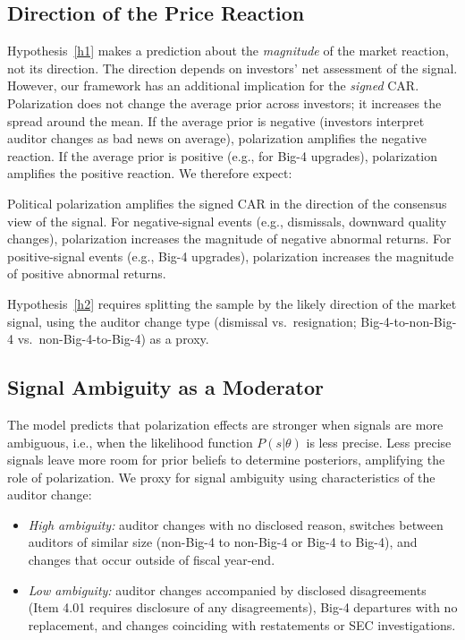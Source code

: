 \subsection{Direction of the Price Reaction}

Hypothesis~\ref{h1} makes a prediction about the \textit{magnitude} of the
market reaction, not its direction. The direction depends on investors'
net assessment of the signal. However, our framework has an additional
implication for the \textit{signed} CAR. Polarization does not change the
average prior across investors; it increases the spread around the mean. If the
average prior is negative (investors interpret auditor changes as bad news on
average), polarization amplifies the negative reaction. If the average prior is
positive (e.g., for Big-4 upgrades), polarization amplifies the positive
reaction. We therefore expect:

\begin{hyp}
    \label{h2}
    Political polarization amplifies the signed CAR in the direction of
    the consensus view of the signal. For negative-signal events (e.g.,
    dismissals, downward quality changes), polarization increases the
    magnitude of negative abnormal returns. For positive-signal events
    (e.g., Big-4 upgrades), polarization increases the magnitude of
    positive abnormal returns.
\end{hyp}

Hypothesis~\ref{h2} requires splitting the sample by the likely direction of the
market signal, using the auditor change type (dismissal vs.\ resignation;
Big-4-to-non-Big-4 vs.\ non-Big-4-to-Big-4) as a proxy.

\subsection{Signal Ambiguity as a Moderator}

The model predicts that polarization effects are stronger when signals are more
ambiguous, i.e., when the likelihood function $P(s|\theta)$ is less precise.
Less precise signals leave more room for prior beliefs to determine posteriors,
amplifying the role of polarization. We proxy for signal ambiguity using
characteristics of the auditor change:

\begin{itemize}
    \item \textit{High ambiguity:} auditor changes with no disclosed reason,
          switches between auditors of similar size (non-Big-4 to non-Big-4 or
          Big-4 to Big-4), and changes that occur outside of fiscal year-end.
    \item \textit{Low ambiguity:} auditor changes accompanied by disclosed
          disagreements (Item 4.01 requires disclosure of any disagreements),
          Big-4 departures with no replacement, and changes coinciding with
          restatements or SEC investigations.
\end{itemize}

